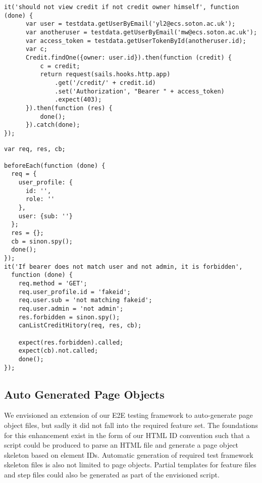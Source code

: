 \begin{listing}[H]
\begin{verbatim}
it('should not view credit if not credit owner himself', function (done) {
      var user = testdata.getUserByEmail('yl2@ecs.soton.ac.uk');
      var anotheruser = testdata.getUserByEmail('mw@ecs.soton.ac.uk');
      var access_token = testdata.getUserTokenById(anotheruser.id);
      var c;
      Credit.findOne({owner: user.id}).then(function (credit) {
          c = credit;
          return request(sails.hooks.http.app)
              .get('/credit/' + credit.id)
              .set('Authorization', "Bearer " + access_token)
              .expect(403);
      }).then(function (res) {
          done();
      }).catch(done);
});
\end{verbatim}
\label{lst:creditcontroller-test-file}
\end{listing}

\begin{listing}[H]
\begin{verbatim}
var req, res, cb;

beforeEach(function (done) {
  req = {
    user_profile: {
      id: '',
      role: ''
    },
    user: {sub: ''}
  };
  res = {};
  cb = sinon.spy();
  done();
});
it('If bearer does not match user and not admin, it is forbidden',
  function (done) {
    req.method = 'GET';
    req.user_profile.id = 'fakeid';
    req.user.sub = 'not matching fakeid';
    req.user.admin = 'not admin';
    res.forbidden = sinon.spy();
    canListCreditHitory(req, res, cb);

    expect(res.forbidden).called;
    expect(cb).not.called;
    done();
});
\end{verbatim}
\label{lst:can-list-credit-test}
\end{listing}

\subsection{Auto Generated Page Objects}
\label{subsec:auto-generated-page-objects}

We envisioned an extension of our E2E testing framework to auto-generate page object files, but sadly it did not fall into the required feature set. The foundations for this enhancement exist in the form of our HTML ID convention such that a script could be produced to parse an HTML file and generate a page object skeleton based on element IDs. Automatic generation of required test framework skeleton files is also not limited to page objects. Partial templates for feature files and step files could also be generated as part of the envisioned script.

